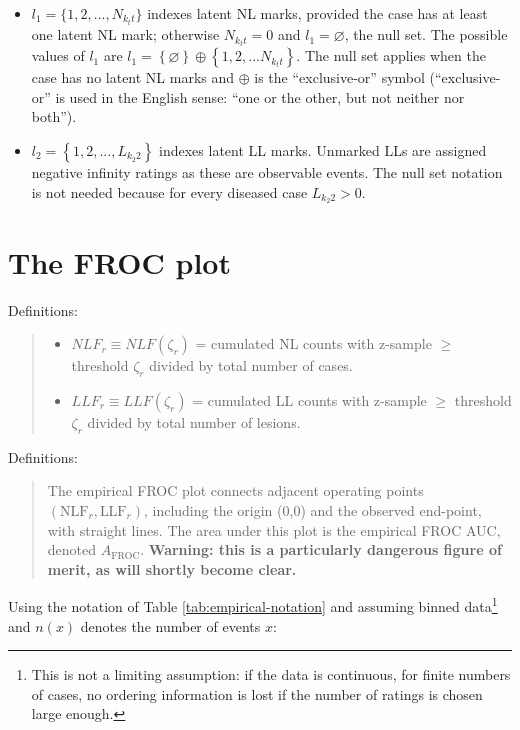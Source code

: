 \documentclass[
]{book}
\providecommand{\tightlist}{%
  \setlength{\itemsep}{0pt}\setlength{\parskip}{0pt}}
\begin{document}
\begin{itemize}
\item
  \(l_1 = \{1, 2, ..., N_{k_t t}\}\) indexes latent NL marks, provided the case has at least one latent NL mark; otherwise \(N_{k_t t} = 0\) and \(l_1 = \varnothing\), the null set. The possible values of \(l_1\) are \(l_1 = \left \{ \varnothing \right \}\oplus \left \{ 1,2,...N_{k_t t} \right \}\). The null set applies when the case has no latent NL marks and \(\oplus\) is the ``exclusive-or'' symbol (``exclusive-or'' is used in the English sense: ``one or the other, but not neither nor both'').
\item
  \(l_2 = \left \{ 1,2,...,L_{k_2 2} \right \}\) indexes latent LL marks. Unmarked LLs are assigned negative infinity ratings as these are observable events. The null set notation is not needed because for every diseased case \(L_{k_2 2} > 0\).
\end{itemize}

\hypertarget{empirical-froc-plot-1}{%
\section{The FROC plot}\label{empirical-froc-plot-1}}

Definitions:

\begin{quote}
\begin{itemize}
\tightlist
\item
  \(NLF_r \equiv NLF(\zeta_r)\) = cumulated NL counts with z-sample \(\geq\) threshold \(\zeta_r\) divided by total number of cases.
\item
  \(LLF_r \equiv LLF(\zeta_r)\) = cumulated LL counts with z-sample \(\geq\) threshold \(\zeta_r\) divided by total number of lesions.
\end{itemize}
\end{quote}

Definitions:

\begin{quote}
The empirical FROC plot connects adjacent operating points \(\left (\text{NLF}_r, \text{LLF}_r \right )\), including the origin (0,0) and the observed end-point, with straight lines. The area under this plot is the empirical FROC AUC, denoted \(A_{\text{FROC}}\). \textbf{Warning: this is a particularly dangerous figure of merit, as will shortly become clear.}
\end{quote}

Using the notation of Table \ref{tab:empirical-notation} and assuming binned data\footnote{This is not a limiting assumption: if the data is continuous, for finite numbers of cases, no ordering information is lost if the number of ratings is chosen large enough.} and \(n(x)\) denotes the number of events \(x\):
\end{document}

